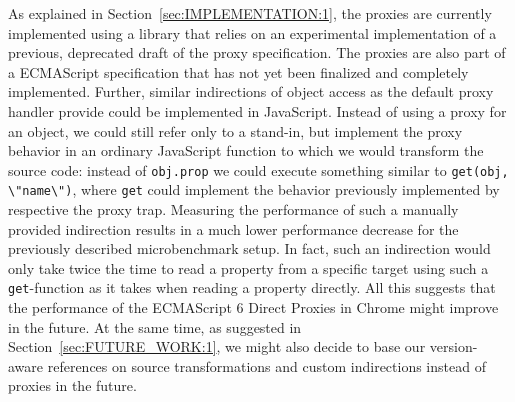As explained in Section~\ref{sec:IMPLEMENTATION:1}, the proxies are currently implemented using a library that relies on an experimental implementation of a previous, deprecated draft of the proxy specification.
The proxies are also part of a ECMAScript specification that has not yet been finalized and completely implemented.
Further, similar indirections of object access as the default proxy handler provide could be implemented in JavaScript.
Instead of using a proxy for an object, we could still refer only to a stand-in, but implement the proxy behavior in an ordinary JavaScript function to which we would transform the source code: instead of \lstinline{obj.prop} we could execute something similar to \lstinline{get(obj, \"name\")}, where \lstinline{get} could implement the behavior previously implemented by respective the proxy trap.
Measuring the performance of such a manually provided indirection results in a much lower performance decrease for the previously described microbenchmark setup.
In fact, such an indirection would only take twice the time to read a property from a specific target using such a \lstinline{get}-function as it takes when reading a property directly. 
All this suggests that the performance of the ECMAScript 6 Direct Proxies in Chrome might improve in the future.
At the same time, as suggested in Section~\ref{sec:FUTURE_WORK:1}, we might also decide to base our version-aware references on source transformations and custom indirections instead of proxies in the future.

